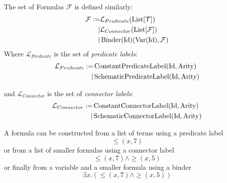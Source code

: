 \begin{defin}[Formulas]
The set of Formulas $\mathcal{F}$ is defined similarly:
\begin{equation}
\begin{split}
\mathcal{F} := & \mathcal{L}_{Predicate}(\operatorname{List}[\mathcal{T}]) \\
              \mid & \mathcal{L}_{Connector}(\operatorname{List}[\mathcal{F}]) \\
              \mid & \operatorname{Binder}(\textnormal{Id})(\operatorname{Var}(\textnormal{Id}), \mathcal{F})
\end{split}
\end{equation}
Where $\mathcal{L}_{Predicate}$ is the set of \textit{predicate labels}:
\begin{equation}
\begin{split}
\mathcal{L}_{Predicate} := & \operatorname{ConstantPredicateLabel}(\textnormal{Id}, \textnormal{Arity})\\
              \mid & \operatorname{SchematicPredicateLabel}(\textnormal{Id}, \textnormal{Arity})
\end{split}
\end{equation}

and $\mathcal{L}_{Connector}$ is the set of \textit{connector labels}:
\begin{equation}
\begin{split}
\mathcal{L}_{Connector} := & \operatorname{ConstantConnectorLabel}(\textnormal{Id}, \textnormal{Arity})\\
              \mid & \operatorname{SchematicConnectorLabel}(\textnormal{Id}, \textnormal{Arity})
\end{split}
\end{equation}

A formula can be constructed from a list of terms using a predicate label
$${\leq}(x, 7)$$
or from a list of smaller formulas using a connector label
$${\leq}(x, 7) \land {\geq}(x, 5)$$
or finally from a variable and a smaller formula using a binder
$$\exists x. \left({\leq}(x, 7) \land {\geq}(x, 5)\right)$$


\end{defin}
